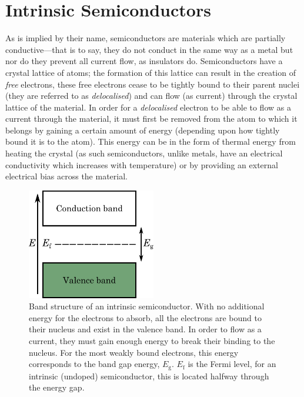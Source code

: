 \section{Intrinsic Semiconductors}\label{sec:intrinsic-semiconductors}
As is implied by their name, semiconductors are materials which are partially conductive---that is to say, they do not conduct in the same way as a metal but nor do they prevent all current flow, as insulators do. Semiconductors have a crystal lattice of atoms; the formation of this lattice can result in the creation of \textit{free} electrons, these free electrons cease to be tightly bound to their parent nuclei (they are referred to as \textit{delocalised}) and can flow (as current) through the crystal lattice of the material. In order for a \textit{delocalised} electron to be able to flow as a current through the material, it must first be removed from the atom to which it belongs by gaining a certain amount of energy (depending upon how tightly bound it is to the atom). This energy can be in the form of thermal energy from heating the crystal (as such semiconductors, unlike metals, have an electrical conductivity which increases with temperature) or by providing an external electrical bias across the material.
\begin{figure}[t]
\begin{center}
\includegraphics[width = 0.5\textwidth]{figures/Semiconductor_intrinsic}
\caption[Band structure of an intrinsic semiconductor]{Band structure of an intrinsic semiconductor. With no additional energy for the electrons to absorb, all the electrons are bound to their nucleus and exist in the valence band. In order to flow as a current, they must gain enough energy to break their binding to the nucleus. For the most weakly bound electrons, this energy corresponds to the band gap energy, $E_{\mathrm{g}}$. $E_{\mathrm{f}}$ is the Fermi level, for an intrinsic (undoped) semiconductor, this is located halfway through the energy gap.}
\label{fig:intrinsicSemiconductorBands}
\end{center}
\end{figure}

